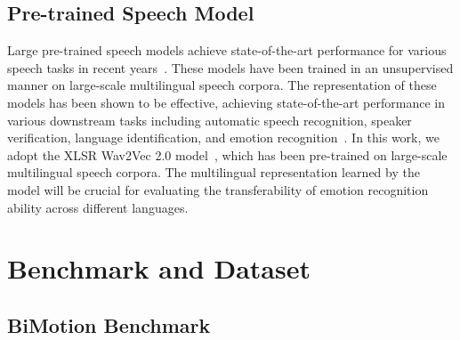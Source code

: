 \documentclass{INTERSPEECH2023}
\newcommand{\pascale}[1]{\textcolor{red}{#1}}
\begin{document}
\subsection{Pre-trained Speech Model} 
Large pre-trained speech models achieve state-of-the-art performance for various speech tasks in recent years~\cite{baevski2020wav2vec2,hsu2021hubert,babu2022interspeech}.
These models have been trained in an unsupervised manner on large-scale multilingual speech corpora. The representation of these models has been shown to be effective, achieving state-of-the-art performance in various downstream tasks including automatic speech recognition, speaker verification, language identification, and emotion recognition~\cite{fan2021verification-lid,pepino2021emotionrecognition,lovenia2022ascend,cahyawijaya2022nusacrowd,dai2022ci}. In this work, we adopt the XLSR Wav2Vec 2.0 model~\cite{baevski2020wav2vec2,babu2022interspeech}, which has been pre-trained on large-scale multilingual speech corpora. The multilingual representation learned by the model will be crucial for evaluating the transferability of emotion recognition ability across different languages.

\section{Benchmark and Dataset}

\subsection{BiMotion Benchmark}
\end{document}
